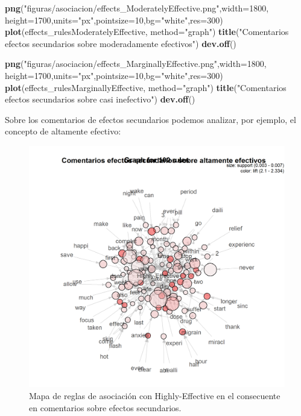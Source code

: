 \documentclass[spanish,]{article}
\newenvironment{Shaded}{\begin{snugshade}}{\end{snugshade}}
\newcommand{\KeywordTok}[1]{\textcolor[rgb]{0.13,0.29,0.53}{\textbf{#1}}}
\newcommand{\DataTypeTok}[1]{\textcolor[rgb]{0.13,0.29,0.53}{#1}}
\newcommand{\DecValTok}[1]{\textcolor[rgb]{0.00,0.00,0.81}{#1}}
\newcommand{\StringTok}[1]{\textcolor[rgb]{0.31,0.60,0.02}{#1}}
\newcommand{\NormalTok}[1]{#1}
\begin{document}
\begin{Shaded}
\begin{Highlighting}[]
\KeywordTok{png}\NormalTok{(}\StringTok{"figuras/asociacion/effects_ModeratelyEffective.png"}\NormalTok{,}\DataTypeTok{width=}\DecValTok{1800}\NormalTok{,}
    \DataTypeTok{height=}\DecValTok{1700}\NormalTok{,}\DataTypeTok{units=}\StringTok{"px"}\NormalTok{,}\DataTypeTok{pointsize=}\DecValTok{10}\NormalTok{,}\DataTypeTok{bg=}\StringTok{"white"}\NormalTok{,}\DataTypeTok{res=}\DecValTok{300}\NormalTok{)}
\KeywordTok{plot}\NormalTok{(effects_rulesModeratelyEffective, }\DataTypeTok{method=}\StringTok{"graph"}\NormalTok{)}
\KeywordTok{title}\NormalTok{(}\StringTok{"Comentarios efectos secundarios sobre moderadamente efectivos"}\NormalTok{)}
\KeywordTok{dev.off}\NormalTok{()}

\KeywordTok{png}\NormalTok{(}\StringTok{"figuras/asociacion/effects_MarginallyEffective.png"}\NormalTok{,}\DataTypeTok{width=}\DecValTok{1800}\NormalTok{,}
    \DataTypeTok{height=}\DecValTok{1700}\NormalTok{,}\DataTypeTok{units=}\StringTok{"px"}\NormalTok{,}\DataTypeTok{pointsize=}\DecValTok{10}\NormalTok{,}\DataTypeTok{bg=}\StringTok{"white"}\NormalTok{,}\DataTypeTok{res=}\DecValTok{300}\NormalTok{)}
\KeywordTok{plot}\NormalTok{(effects_rulesMarginallyEffective, }\DataTypeTok{method=}\StringTok{"graph"}\NormalTok{)}
\KeywordTok{title}\NormalTok{(}\StringTok{"Comentarios efectos secundarios sobre casi inefectivo"}\NormalTok{)}
\KeywordTok{dev.off}\NormalTok{()}
\end{Highlighting}
\end{Shaded}

Sobre los comentarios de efectos secundarios podemos analizar, por
ejemplo, el concepto de altamente efectivo:

\begin{figure}[h]
    \centering
    \includegraphics[width=1\textwidth]{figuras/asociacion/effects_HighlyEffective.png}
    \caption{Mapa de reglas de asociación con Highly-Effective en el consecuente en comentarios sobre efectos secundarios.}
    \label{fig:asociacion:innefectiveAsociacion}
\end{figure}
\end{document}
